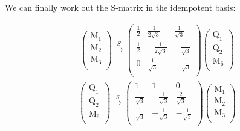 \documentclass[12pt,a4paper]{article}
\newcounter{arrow}
\begin{document}
We can finally work out the S-matrix in the idempotent basis:

\begin{align}\left( \begin{matrix}
\text{M}_1\\
\text{M}_2\\
\text{M}_3\\
\end{matrix} \right)
\xrightarrow{S}
\left( \begin{matrix}
\frac{1}{2} & \frac{1}{2 \sqrt{3}} &  \frac{1}{\sqrt{3}} \\
\frac{1}{2} & - \frac{1}{2\sqrt{3}} & -\frac{1}{\sqrt{3}} \\
0& \frac{1}{\sqrt{3}} & -\frac{1}{\sqrt{3}} \\
\end{matrix} \right)
\left( \begin{matrix}
\text{Q}_1\\
\text{Q}_2\\
\text{M}_6\\
\end{matrix} \right)
\end{align}
\begin{align}
\left( \begin{matrix}
\text{Q}_1\\
\text{Q}_2\\
\text{M}_6\\
\end{matrix} \right)
\xrightarrow{S}
\left( \begin{matrix}
1& 1& 0 \\
\frac{1}{\sqrt{3}} & - \frac{1}{\sqrt{3}} & \frac{2}{\sqrt{3}} \\
\frac{1}{\sqrt{3}} & - \frac{1}{\sqrt{3}} & - \frac{1}{\sqrt{3}} \\
\end{matrix} \right)
\left( \begin{matrix}
\text{M}_1\\
\text{M}_2\\
\text{M}_3\\
\end{matrix} \right)
\end{align}
\end{document}
